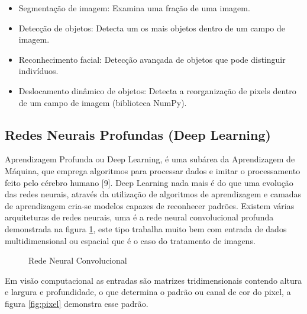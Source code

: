 \begin{itemize}
    \item Segmentação de imagem: Examina uma fração de uma imagem.
    \item Detecção de objetos: Detecta um os mais objetos dentro de um campo de imagem.
    \item Reconhecimento facial: Detecção avançada de objetos que pode distinguir indivíduos.
    \item Deslocamento dinâmico de objetos: Detecta a reorganização de pixels dentro de um campo de imagem (biblioteca NumPy).
\end{itemize}
\subsection{Redes Neurais Profundas (Deep Learning)}
Aprendizagem Profunda ou Deep Learning, é uma subárea da Aprendizagem de Máquina, que emprega algoritmos para processar dados e imitar o processamento feito pelo cérebro humano [9].
Deep Learning nada mais é do que uma evolução das redes neurais, através da utilização de algoritmos de aprendizagem e camadas de aprendizagem cria-se modelos capazes de reconhecer padrões.
Existem várias arquiteturas de redes neurais, uma é a rede neural convolucional profunda demonstrada na figura \ref{fig:neuralConv}, este tipo trabalha muito bem com entrada de dados multidimensional ou espacial que é o caso do tratamento de imagens. 

%
\begin{figure}[H]
	\centering
	\caption{Rede Neural Convolucional}
	\def\svgwidth{16cm}
	
	\label{fig:neuralConv}
\end{figure}

Em visão computacional as entradas são matrizes tridimensionais contendo altura e largura e profundidade, o que determina o padrão ou canal de cor do pixel, a figura \ref{fig:pixel} demonstra esse padrão.


